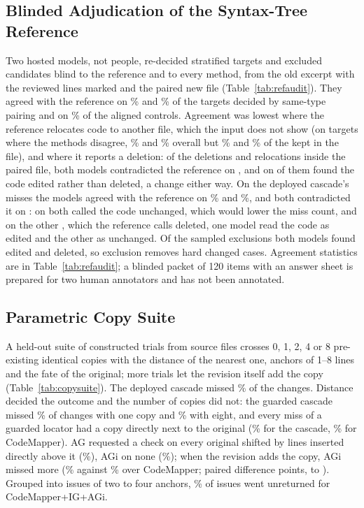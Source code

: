 \subsection{Blinded Adjudication of the Syntax-Tree Reference}\label{sec:r02refaudit}
Two hosted models, not people, re-decided \wrAllN{} stratified targets and \wrExclN{} excluded candidates blind to the reference and to every method, from the old excerpt with the reviewed lines marked and the paired new file (Table~\ref{tab:refaudit}). They agreed with the reference on \wrPairBeamStatus\% and \wrPairNemoStatus\% of the targets decided by same-type pairing and on \wrAlignedBeamStatus\% of the aligned controls. Agreement was lowest where the reference relocates code to another file, which the input does not show (on targets where the methods disagree, \wrDisBeamStatus\% and \wrDisNemoStatus\% overall but \wrDisWithinBeamStatus\% and \wrDisWithinNemoStatus\% of the \wrDisWithinN{} kept in the file), and where it reports a deletion: of the \wrDelWithinN{} deletions and relocations inside the paired file, both models contradicted the reference on \wrDelWithinSuspect{}, and on \wrDelWithinEdited{} of them found the code edited rather than deleted, a change either way. On the deployed cascade's \wrMissN{} misses the models agreed with the reference on \wrMissBeamStatus\% and \wrMissNemoStatus\%, and both contradicted it on \wrMissSuspect{}: on \wrMissLowering{} both called the code unchanged, which would lower the miss count, and on the other \wrMissOther{}, which the reference calls deleted, one model read the code as edited and the other as unchanged. Of the \wrExclN{} sampled exclusions both models found \wrExclEdited{} edited and \wrExclDeleted{} deleted, so exclusion removes hard changed cases. Agreement statistics are in Table~\ref{tab:refaudit}; a blinded packet of 120 items with an answer sheet is prepared for two human annotators and has not been annotated.

\subsection{Parametric Copy Suite}
A held-out suite of \wpNMain{} constructed trials from \wpSources{} source files crosses 0, 1, 2, 4 or 8 pre-existing identical copies with the distance of the nearest one, anchors of 1--8 lines and the fate of the original; \wpNSame{} more trials let the revision itself add the copy (Table~\ref{tab:copysuite}). The deployed cascade missed \wpDepMiss\% of the changes. Distance decided the outcome and the number of copies did not: the guarded cascade missed \wpGiCOneMiss\% of changes with one copy and \wpGiCEightMiss\% with eight, and every miss of a guarded locator had a copy directly next to the original (\wpGiDAdjMiss\% for the cascade, \wpCmGiDAdjMiss\% for CodeMapper). AG requested a check on every original shifted by lines inserted directly above it (\wpAgFShiftExtra\%), AGi on none (\wpGiFShiftExtra\%); when the revision adds the copy, AGi missed more (\wpCmGiSameMiss\% against \wpCmAgSameMiss\% over CodeMapper; paired difference \wpSameDCmGiVCmAgMiss{} points, \wpSameDCmGiVCmAgMissLo{} to \wpSameDCmGiVCmAgMissHi). Grouped into issues of two to four anchors, \wpCmGiIssueMiss\% of issues went unreturned for CodeMapper+IG+AGi.


